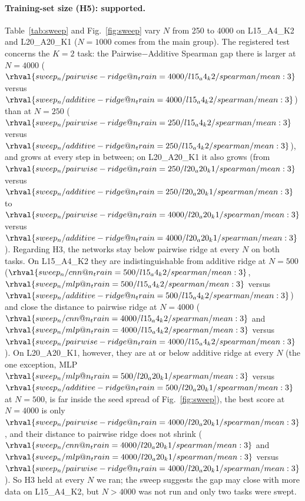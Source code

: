 \paragraph{Training-set size (H5): supported.} Table~\ref{tab:sweep} and Fig.~\ref{fig:sweep} vary $N$ from 250 to 4000 on L15\_A4\_K2 and L20\_A20\_K1 ($N=1000$ comes from the main group). The registered test concerns the $K=2$ task: the Pairwise$-$Additive Spearman gap there is larger at $N=4000$ ($\rhval{sweep_n/pairwise-ridge@n_train=4000/l15_a4_k2/spearman/mean:3}$ versus $\rhval{sweep_n/additive-ridge@n_train=4000/l15_a4_k2/spearman/mean:3}$) than at $N=250$ ($\rhval{sweep_n/pairwise-ridge@n_train=250/l15_a4_k2/spearman/mean:3}$ versus $\rhval{sweep_n/additive-ridge@n_train=250/l15_a4_k2/spearman/mean:3}$), and grows at every step in between; on L20\_A20\_K1 it also grows (from $\rhval{sweep_n/pairwise-ridge@n_train=250/l20_a20_k1/spearman/mean:3}$ versus $\rhval{sweep_n/additive-ridge@n_train=250/l20_a20_k1/spearman/mean:3}$ to $\rhval{sweep_n/pairwise-ridge@n_train=4000/l20_a20_k1/spearman/mean:3}$ versus $\rhval{sweep_n/additive-ridge@n_train=4000/l20_a20_k1/spearman/mean:3}$). Regarding H3, the networks stay below pairwise ridge at every $N$ on both tasks. On L15\_A4\_K2 they are indistinguishable from additive ridge at $N=500$ ($\rhval{sweep_n/cnn@n_train=500/l15_a4_k2/spearman/mean:3}$, $\rhval{sweep_n/mlp@n_train=500/l15_a4_k2/spearman/mean:3}$ versus $\rhval{sweep_n/additive-ridge@n_train=500/l15_a4_k2/spearman/mean:3}$) and close the distance to pairwise ridge at $N=4000$ ($\rhval{sweep_n/cnn@n_train=4000/l15_a4_k2/spearman/mean:3}$ and $\rhval{sweep_n/mlp@n_train=4000/l15_a4_k2/spearman/mean:3}$ versus $\rhval{sweep_n/pairwise-ridge@n_train=4000/l15_a4_k2/spearman/mean:3}$). On L20\_A20\_K1, however, they are at or below additive ridge at every $N$ (the one exception, MLP $\rhval{sweep_n/mlp@n_train=500/l20_a20_k1/spearman/mean:3}$ versus $\rhval{sweep_n/additive-ridge@n_train=500/l20_a20_k1/spearman/mean:3}$ at $N=500$, is far inside the seed spread of Fig.~\ref{fig:sweep}), the best score at $N=4000$ is only $\rhval{sweep_n/pairwise-ridge@n_train=4000/l20_a20_k1/spearman/mean:3}$, and their distance to pairwise ridge does not shrink ($\rhval{sweep_n/cnn@n_train=4000/l20_a20_k1/spearman/mean:3}$ and $\rhval{sweep_n/mlp@n_train=4000/l20_a20_k1/spearman/mean:3}$ versus $\rhval{sweep_n/pairwise-ridge@n_train=4000/l20_a20_k1/spearman/mean:3}$). So H3 held at every $N$ we ran; the sweep suggests the gap may close with more data on L15\_A4\_K2, but $N>4000$ was not run and only two tasks were swept.

